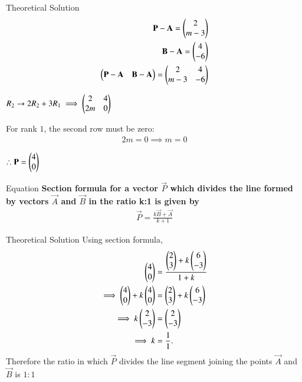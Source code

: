 \documentclass{beamer}
\begin{document}
\begin{frame}{Theoretical Solution}
\begin{align}
            \mathbf{P}-\mathbf{A} = \begin{pmatrix}2\\m-3\end{pmatrix}\\
            \mathbf{B}-\mathbf{A} = \begin{pmatrix}4\\-6\end{pmatrix}\\
            \begin{pmatrix}\mathbf{P}-\mathbf{A}& \mathbf{B}-\mathbf{A}\end{pmatrix} = \begin{pmatrix}2 & 4\\m-3 & -6\end{pmatrix}
\end{align}
\begin{center}
$R_2 \rightarrow 2R_2 + 3R_1 \implies \begin{pmatrix}2 & 4\\2m & 0\end{pmatrix}$
\end{center}
For rank $1$, the second row must be zero:
\begin{align}
    2m=0 \implies m=0
\end{align}
\begin{center}
$\therefore \vec{P}=\begin{myvec}{4\\0}\end{myvec}$
\end{center}
\end{frame}

\begin{frame}{Equation}
\textbf{Section formula for a vector $\vec{P}$ which divides the line formed by vectors $\vec{A}$ and $\vec{B}$ in the ratio k:1 is given by}
\begin{align}
    \vec{P}=\frac{k\vec{B}+\vec{A}}{k+1}
\end{align}
\end{frame}
\begin{frame}{Theoretical Solution}
Using section formula,\\
\begin{align}
         \begin{pmatrix}4\\0\end{pmatrix} &=\frac{{\begin{pmatrix}2\\3\end{pmatrix}+k\begin{pmatrix}6\\-3\end{pmatrix}}}{1+k}\\
    \implies\begin{pmatrix}4\\0\end{pmatrix} + k\begin{pmatrix}4\\0\end{pmatrix} &=\begin{pmatrix}2\\3\end{pmatrix}+k\begin{pmatrix}6\\-3\end{pmatrix}\\ 
	 \implies k\begin{pmatrix}2 \\ -3\end{pmatrix} &= \begin{pmatrix}2 \\ -3\end{pmatrix}
	 \\
	 \implies k &= \frac{1}{1}.
\end{align}
\bigskip
Therefore the ratio in which $\vec{P}$ divides the line segment joining the points $\vec{A}$ and $\vec{B}$ is $1:1$
\end{frame}
\end{document}
